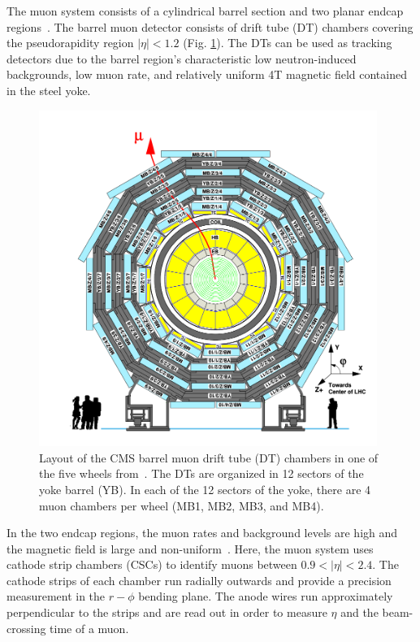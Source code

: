 The muon system consists of a cylindrical barrel section and two planar endcap regions~\cite{CMS-2008-JINST-3-S08004}. The barrel muon detector consists of drift tube (DT) chambers covering the pseudorapidity region $|\eta| < 1.2$ (Fig. \ref{fig:phase-1-muon-barrel-DT-schematic}). The DTs can be used as tracking detectors due to the barrel region's characteristic low neutron-induced backgrounds, low muon rate, and relatively uniform 4T magnetic field contained in the steel yoke. 

\begin{figure}[ht]
    \centering
    \includegraphics[width=11cm]{figures/ch-2-cern-cms/phase-1-muon-barrel-DT-schematic.png}
    \caption[Layout of the CMS barrel muon drift tube (DT) chambers in one of the five wheels.]{Layout of the CMS barrel muon drift tube (DT) chambers in one of the five wheels from~\cite{CMS-2008-JINST-3-S08004}. The DTs are organized in 12 sectors of the yoke barrel (YB). In each of the 12 sectors of the yoke, there are 4 muon chambers per wheel (MB1, MB2, MB3, and MB4).}
    \label{fig:phase-1-muon-barrel-DT-schematic}
\end{figure}

In the two endcap regions, the muon rates and background levels are high and the magnetic field is large and non-uniform~\cite{CMS-2008-JINST-3-S08004}. Here, the muon system uses cathode strip chambers (CSCs) to identify muons between $0.9 < |\eta| < 2.4$. The cathode strips of each chamber run radially outwards and provide a precision measurement in the $r-\phi$ bending plane. The anode wires run approximately perpendicular to the strips and are read out in order to measure $\eta$ and the beam-crossing time of a muon. 

